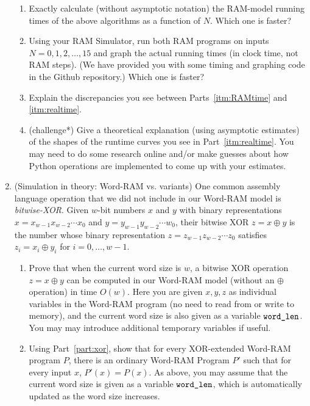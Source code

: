 \documentclass[11pt]{article}
\begin{document}
\begin{enumerate}
\begin{enumerate}
    \item Exactly calculate (without asymptotic notation) the RAM-model running times of the above algorithms as a function of $N$.
    Which one is faster? \label{itm:RAMtime}
    
    \item Using your RAM Simulator, run both RAM programs on inputs $N=0,1,2,\ldots,15$ and graph the actual running times (in clock time, not RAM steps).  (We have provided you with some timing and graphing code in the Github repository.) Which one is faster?  \label{itm:realtime}  
    
    \item Explain the discrepancies you see between Parts~\ref{itm:RAMtime} and \ref{itm:realtime}.
    
    \item (challenge*) Give a theoretical explanation (using asymptotic estimates) of the shapes of the runtime curves you see in Part~\ref{itm:realtime}. You may need to do some research online and/or make guesses about how Python operations are implemented to come up with your estimates.
\end{enumerate}

\item (Simulation in theory: Word-RAM vs. variants) One common assembly language operation that we did not include in our Word-RAM model is {\em bitwise-XOR}.  Given $w$-bit numbers $x$ and $y$ with binary representations $x=x_{w-1}x_{w-2}\cdots x_0$ and $y=y_{w-1}y_{w-2}\cdots w_0$, their bitwise XOR $z=x\oplus y$ is the number whose binary representation $z=z_{w-1}z_{w-2}\cdots z_0$ satisfies $z_i = x_i \oplus y_i$ for $i=0,\ldots,w-1$.

\begin{enumerate}
    \item Prove that when the current word size is $w$, a bitwise XOR operation $z=x \oplus y$ can be computed in our Word-RAM model (without an $\oplus$ operation) in time $O(w)$.  Here you are given $x,y,z$ as individual variables in the Word-RAM program (no need to read from or write to memory), and the current word size is also given as a variable $\texttt{word\_len}$.  You may may introduce additional temporary variables if useful. \label{part:xor}
    
    \item Using Part~\ref{part:xor}, show that for every XOR-extended Word-RAM program $P$, there is an ordinary Word-RAM Program $P'$ such that for every input $x$, $P'(x)=P(x)$. As above, you may assume that the current word size is given as a variable $\texttt{word\_len}$, which is automatically updated as the word size increases.
    

\end{enumerate}
\end{enumerate}
\end{document}

